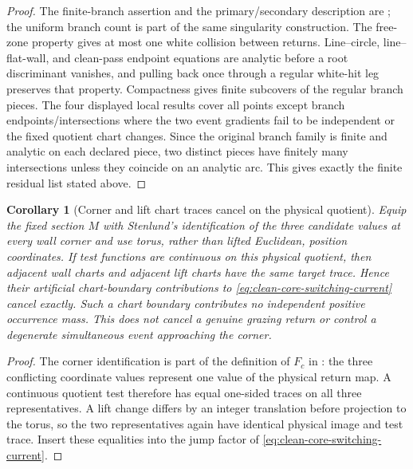 \documentclass[11pt]{article}
\newtheorem{corollary}[theorem]{Corollary}
\begin{document}
\begin{proof}
The finite-branch assertion and the primary/secondary description are
\cite[Section~4.1]{StenlundRandom}; the uniform branch count is part of the
same singularity construction.  The free-zone property gives at most one
white collision between returns.  Line--circle, line--flat-wall, and
clean-pass endpoint equations are analytic before a root discriminant
vanishes, and pulling back once through a regular white-hit leg preserves
that property.  Compactness gives finite subcovers of the regular branch
pieces.  The four displayed local results cover all points except branch
endpoints/intersections where the two event gradients fail to be
independent or the fixed quotient chart changes.  Since the original
branch family is finite and analytic on each declared piece, two distinct
pieces have finitely many intersections unless they coincide on an analytic
arc.  This gives exactly the finite residual list stated above.
\end{proof}

\begin{corollary}[Corner and lift chart traces cancel on the physical
quotient]
\label{cor:fixed-section-corner-lift-trace}
Equip the fixed section $M$ with Stenlund's identification of the three
candidate values at every wall corner and use torus, rather than lifted
Euclidean, position coordinates.  If test functions are continuous on this
physical quotient, then adjacent wall charts and adjacent lift charts have
the same target trace.  Hence their artificial chart-boundary contributions
to \eqref{eq:clean-core-switching-current} cancel exactly.  Such a chart
boundary contributes no independent positive occurrence mass.  This does
not cancel a genuine grazing return or control a degenerate simultaneous
event approaching the corner.
\end{corollary}

\begin{proof}
The corner identification is part of the definition of $F_c$ in
\cite[Section~2.3]{StenlundRandom}: the three conflicting coordinate values
represent one value of the physical return map.  A continuous quotient test
therefore has equal one-sided traces on all three representatives.  A lift
change differs by an integer translation before projection to the torus, so
the two representatives again have identical physical image and test trace.
Insert these equalities into the jump factor of
\eqref{eq:clean-core-switching-current}.
\end{proof}
\end{document}
